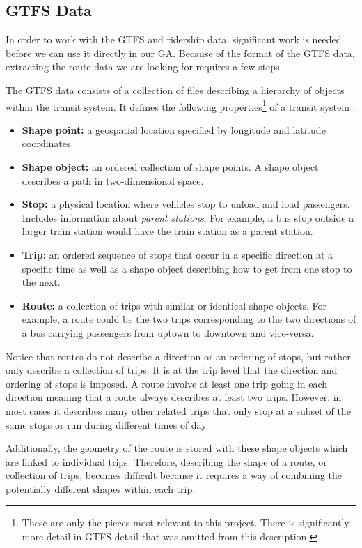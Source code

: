 \documentclass[11pt]{amsart}
\theoremstyle{definition}                  %
\theoremstyle{remark}                       %
\numberwithin{equation}{section}
\begin{document}
\subsection{GTFS Data}
In order to work with the GTFS and ridership data, significant work is needed before we can use it directly in our GA. Because of the format of the GTFS data, extracting the route data we are looking for requires a few steps. 

The GTFS data consists of a collection of files describing a hierarchy of objects within the transit system. It defines the following properties\footnote{These are only the pieces most relevant to this project. There is significantly more detail in GTFS detail that was omitted from this description.} of a transit system \cite{gtfs}: 
\begin{itemize}
    \item \textbf{Shape point:} a geospatial location specified by longitude and latitude coordinates. 
    \item \textbf{Shape object:} an ordered collection of shape points. A shape object describes a path in two-dimensional space. 
    \item \textbf{Stop:} a physical location where vehicles stop to unload and load passengers. Includes information about \textit{parent stations}. For example, a bus stop outside a larger train station would have the train station as a parent station.
    \item \textbf{Trip:} an ordered sequence of stops that occur in a specific direction at a specific time as well as a shape object describing how to get from one stop to the next. 
    \item \textbf{Route:} a collection of trips with similar or identical shape objects. For example, a route could be the two trips corresponding to the two directions of a bus carrying passengers from uptown to downtown and vice-versa. 
\end{itemize}

Notice that routes do not describe a direction or an ordering of stops, but rather only describe a collection of trips. It is at the trip level that the direction and ordering of stops is imposed. A route involve at least one trip going in each direction meaning that a route always describes at least two trips. However, in most cases it describes many other related trips that only stop at a subset of the same stops or run during different times of day. 

Additionally, the geometry of the route is stored with these shape objects which are linked to individual trips. Therefore, describing the shape of a route, or collection of trips, becomes difficult because it requires a way of combining the potentially different shapes within each trip. 
\end{document}

